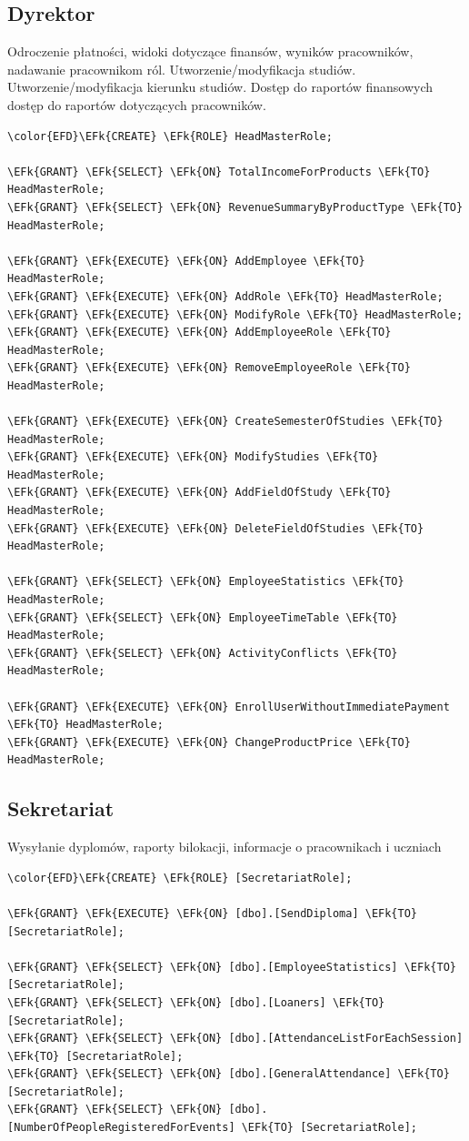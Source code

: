 \documentclass[11pt]{article}
\newcommand{\EFk}[1]{\textcolor{EFk}{\textbf{#1}}} %
\begin{document}
\subsection{Dyrektor}
\label{sec:orgbb9a5ca}
Odroczenie płatności, widoki dotyczące finansów, wyników pracowników, nadawanie pracownikom ról. Utworzenie/modyfikacja studiów. Utworzenie/modyfikacja kierunku studiów. Dostęp do raportów finansowych dostęp do raportów dotyczących pracowników.
\begin{Code}
\begin{Verbatim}
\color{EFD}\EFk{CREATE} \EFk{ROLE} HeadMasterRole;

\EFk{GRANT} \EFk{SELECT} \EFk{ON} TotalIncomeForProducts \EFk{TO} HeadMasterRole;
\EFk{GRANT} \EFk{SELECT} \EFk{ON} RevenueSummaryByProductType \EFk{TO} HeadMasterRole;

\EFk{GRANT} \EFk{EXECUTE} \EFk{ON} AddEmployee \EFk{TO} HeadMasterRole;
\EFk{GRANT} \EFk{EXECUTE} \EFk{ON} AddRole \EFk{TO} HeadMasterRole;
\EFk{GRANT} \EFk{EXECUTE} \EFk{ON} ModifyRole \EFk{TO} HeadMasterRole;
\EFk{GRANT} \EFk{EXECUTE} \EFk{ON} AddEmployeeRole \EFk{TO} HeadMasterRole;
\EFk{GRANT} \EFk{EXECUTE} \EFk{ON} RemoveEmployeeRole \EFk{TO} HeadMasterRole;

\EFk{GRANT} \EFk{EXECUTE} \EFk{ON} CreateSemesterOfStudies \EFk{TO} HeadMasterRole;
\EFk{GRANT} \EFk{EXECUTE} \EFk{ON} ModifyStudies \EFk{TO} HeadMasterRole;
\EFk{GRANT} \EFk{EXECUTE} \EFk{ON} AddFieldOfStudy \EFk{TO} HeadMasterRole;
\EFk{GRANT} \EFk{EXECUTE} \EFk{ON} DeleteFieldOfStudies \EFk{TO} HeadMasterRole;

\EFk{GRANT} \EFk{SELECT} \EFk{ON} EmployeeStatistics \EFk{TO} HeadMasterRole;
\EFk{GRANT} \EFk{SELECT} \EFk{ON} EmployeeTimeTable \EFk{TO} HeadMasterRole;
\EFk{GRANT} \EFk{SELECT} \EFk{ON} ActivityConflicts \EFk{TO} HeadMasterRole;

\EFk{GRANT} \EFk{EXECUTE} \EFk{ON} EnrollUserWithoutImmediatePayment \EFk{TO} HeadMasterRole;
\EFk{GRANT} \EFk{EXECUTE} \EFk{ON} ChangeProductPrice \EFk{TO} HeadMasterRole;

\end{Verbatim}
\end{Code}
\subsection{Sekretariat}
\label{sec:org7150815}
Wysyłanie dyplomów, raporty bilokacji, informacje o pracownikach i uczniach
\begin{Code}
\begin{Verbatim}
\color{EFD}\EFk{CREATE} \EFk{ROLE} [SecretariatRole];

\EFk{GRANT} \EFk{EXECUTE} \EFk{ON} [dbo].[SendDiploma] \EFk{TO} [SecretariatRole];

\EFk{GRANT} \EFk{SELECT} \EFk{ON} [dbo].[EmployeeStatistics] \EFk{TO} [SecretariatRole];
\EFk{GRANT} \EFk{SELECT} \EFk{ON} [dbo].[Loaners] \EFk{TO} [SecretariatRole];
\EFk{GRANT} \EFk{SELECT} \EFk{ON} [dbo].[AttendanceListForEachSession] \EFk{TO} [SecretariatRole];
\EFk{GRANT} \EFk{SELECT} \EFk{ON} [dbo].[GeneralAttendance] \EFk{TO} [SecretariatRole];
\EFk{GRANT} \EFk{SELECT} \EFk{ON} [dbo].[NumberOfPeopleRegisteredForEvents] \EFk{TO} [SecretariatRole];
\end{Verbatim}
\end{Code}
\end{document}
